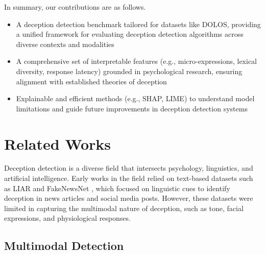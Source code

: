 \documentclass[11pt]{article}
\begin{document}
In summary, our contributions are as follows.
\begin{itemize}
  \item A deception detection benchmark tailored for datasets like DOLOS, providing a unified framework for evaluating deception detection algorithms across diverse contexts and modalities
  \item A comprehensive set of interpretable features (e.g., micro-expressions, lexical diversity, response latency) grounded in psychological research, ensuring alignment with established theories of deception
  \item Explainable and efficient methods (e.g., SHAP, LIME) to understand model limitations and guide future improvements in deception detection systems
\end{itemize}

\section{Related Works}
Deception detection is a diverse field that intersects psychology, linguistics, and artificial intelligence. Early works in the field relied on text-based datasets such as LIAR \citep{wang2017liarliarpantsfire} and FakeNewsNet \citep{shu2019fakenewsnet}, which focused on linguistic cues to identify deception in news articles and social media posts. However, these datasets were limited in capturing the multimodal nature of deception, such as tone, facial expressions, and physiological responses. 

\subsection{Multimodal Detection}
\end{document}
